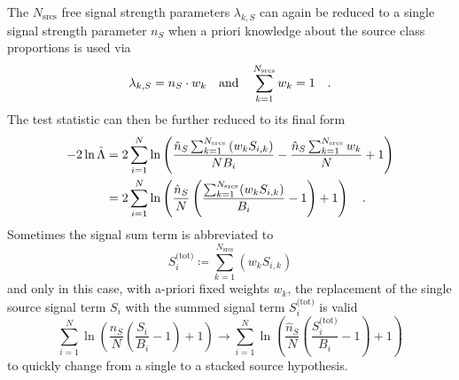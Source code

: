 The $N_\text{srcs}$ free signal strength parameters $\lambda_{k,S}$ can again be reduced to a single signal strength parameter $n_S$ when a priori knowledge about the source class proportions is used via
\begin{equation}
  \lambda_{k,S} = n_S \cdot w_k
  \quad\text{and}\quad
  \sum_{k=1}^{N_\text{srcs}} w_k = 1
  \quad\text{.}
\end{equation}
The test statistic can then be further reduced to its final form
\begin{align}
  -2\ln\hat{\Lambda}
  &= 2\sum_{i=1}^N \ln\left(
        \frac{\hat{n}_S \sum_{k=1}^{N_\text{srcs}}\left(w_k S_{i,k}\right)}
             {N B_i} -
        \frac{\hat{n}_S \sum_{k=1}^{N_\text{srcs}}w_k}{N} + 1
      \right) \\
  &= 2\sum_{i=1}^N \ln\left(
        \frac{\hat{n}_S}{N}\left(
          \frac{\sum_{k=1}^{N_\text{srcs}}(w_k S_{i,k})}{B_i} - 1
        \right) + 1
      \right)
  \quad\text{.}
\end{align}
Sometimes the signal sum term is abbreviated to
\begin{equation}
  S_i^\text{(tot)} \coloneqq \sum_{k=1}^{N_\text{srcs}}\left(w_k S_{i,k}\right)
\end{equation}
and only in this case, with a-priori fixed weights $w_k$, the replacement of the single source signal term $S_i$ with the summed signal term $S_i^\text{(tot)}$ is valid
\begin{equation}
  \sum_{i=1}^N \ln\left(
      \frac{\hat{n}_S}{N}\left( \frac{S_i}{B_i} - 1 \right) + 1
    \right)
  \rightarrow
  \sum_{i=1}^N \ln\left(
      \frac{\hat{n}_S}{N}\left( \frac{S_i^\text{(tot)}}{B_i} - 1 \right) + 1
    \right)
\end{equation}
to quickly change from a single to a stacked source hypothesis.

